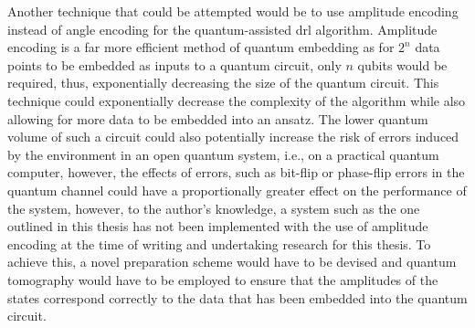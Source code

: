 Another technique that could be attempted would be to use amplitude encoding instead of angle encoding for the quantum-assisted \acrshort{drl} algorithm. 
Amplitude encoding is a far more efficient method of quantum embedding as for $2^{n}$ data points to be embedded as inputs to a quantum circuit, only $n$ qubits would be required, thus, exponentially decreasing the size of the quantum circuit. 
This technique could exponentially decrease the complexity of the algorithm while also allowing for more data to be embedded into an ansatz. 
The lower quantum volume of such a circuit could also potentially increase the risk of errors induced by the environment in an open quantum system, i.e., on a practical quantum computer, however, the effects of errors, such as bit-flip or phase-flip errors in the quantum channel could have a proportionally greater effect on the performance of the system, however, to the author's knowledge, a system such as the one outlined in this thesis has not been implemented with the use of amplitude encoding at the time of writing and undertaking research for this thesis. 
To achieve this, a novel preparation scheme would have to be devised and quantum tomography would have to be employed to ensure that the amplitudes of the states correspond correctly to the data that has been embedded into the quantum circuit. 